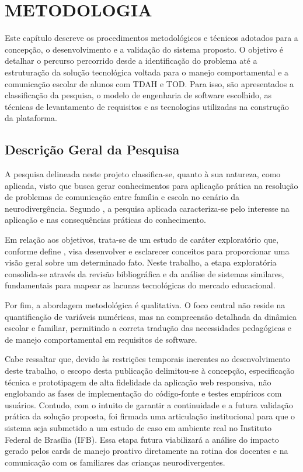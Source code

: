 
\chapter{METODOLOGIA}
\label{chap:metodologia}

Este capítulo descreve os procedimentos metodológicos e técnicos adotados para a concepção, o desenvolvimento e a validação do sistema proposto. O objetivo é detalhar o percurso percorrido desde a identificação do problema até a estruturação da solução tecnológica voltada para o manejo comportamental e a comunicação escolar de alunos com TDAH e TOD. Para isso, são apresentados a classificação da pesquisa, o modelo de engenharia de software escolhido, as técnicas de levantamento de requisitos e as tecnologias utilizadas na construção da plataforma.

\vspace{0.5cm}
\section{Descrição Geral da Pesquisa}

A pesquisa delineada neste projeto classifica-se, quanto à sua natureza, como aplicada, visto que busca gerar conhecimentos para aplicação prática na resolução de problemas de comunicação entre família e escola no cenário da neurodivergência. Segundo , a pesquisa aplicada caracteriza-se pelo interesse na aplicação e nas consequências práticas do conhecimento.

Em relação aos objetivos, trata-se de um estudo de caráter exploratório que, conforme define , visa desenvolver e esclarecer conceitos para proporcionar uma visão geral sobre um determinado fato. Neste trabalho, a etapa exploratória consolida-se através da revisão bibliográfica e da análise de sistemas similares, fundamentais para mapear as lacunas tecnológicas do mercado educacional.

Por fim, a abordagem metodológica é qualitativa. O foco central não reside na quantificação de variáveis numéricas, mas na compreensão detalhada da dinâmica escolar e familiar, permitindo a correta tradução das necessidades pedagógicas e de manejo comportamental em requisitos de software.

Cabe ressaltar que, devido às restrições temporais inerentes ao desenvolvimento deste trabalho, o escopo desta publicação delimitou-se à concepção, especificação técnica e prototipagem de alta fidelidade da aplicação web responsiva, não englobando as fases de implementação do código-fonte e testes empíricos com usuários. Contudo, com o intuito de garantir a continuidade e a futura validação prática da solução proposta, foi firmada uma articulação institucional para que o sistema seja submetido a um estudo de caso em ambiente real no Instituto Federal de Brasília (IFB). Essa etapa futura viabilizará a análise do impacto gerado pelos cards de manejo proativo diretamente na rotina dos docentes e na comunicação com os familiares das crianças neurodivergentes.

